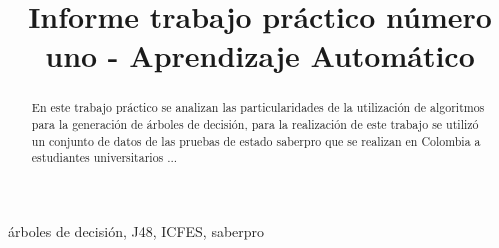 \documentclass[10pt,conference, onecolumn]{IEEEtran}
\begin{document}
\pagestyle{empty}  


\title{Informe trabajo práctico número uno - Aprendizaje Automático}

\author{
\and
{}
}

\maketitle

\begin{abstract}

En este trabajo práctico se analizan las particularidades de la utilización de
algoritmos para la generación de árboles de decisión, para la realización de este
trabajo se utilizó un conjunto de datos de las pruebas de estado saberpro que se realizan 
en Colombia a estudiantes universitarios ...

\end{abstract}
 


\begin{IEEEkeywords}
árboles de decisión, J48, ICFES, saberpro
\end{IEEEkeywords}

\thispagestyle{empty} 

\IEEEpeerreviewmaketitle













\ifCLASSOPTIONcaptionsoff
  \newpage
\fi





\end{document}

